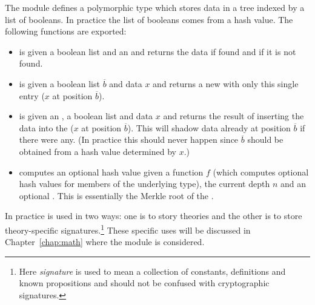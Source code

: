 The module {} defines a polymorphic type {}
which stores data in a tree indexed by a list of booleans.
In practice the list of booleans comes from a hash value.
The following functions are exported:
\begin{itemize}
\item {} is given a boolean list and an {}
and returns the data if found and {} if it is not found.
\item {} is given a boolean list $\overline{b}$ and data $x$
and returns a new {} with only this single entry ($x$ at position $\overline{b}$).
\item {} is given an {}, a boolean list and data $x$
and returns the result of inserting the data into the {} ($x$ at position $\overline{b}$).
This will shadow data already at position $\overline{b}$ if there were any. (In practice this should never
happen since $\overline{b}$ should be obtained from a hash value determined by $x$.)
\item {} computes an optional hash value
given a function $f$ (which computes optional hash values for members of the underlying type),
the current depth $n$
and an optional {}.
This is essentially the Merkle root of the {}.
\end{itemize}

In practice {} is used in two ways: one is to story theories
and the other is to store theory-specific signatures.\footnote{Here {\em{signature}} is used
to mean a collection of constants, definitions and known propositions and should not
be confused with cryptographic signatures.}
These specific uses will be discussed in Chapter~\ref{chap:math}
where the module {} is considered.
